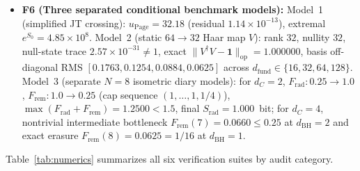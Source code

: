 \documentclass[11pt,a4paper]{article}
\theoremstyle{definition}
\theoremstyle{remark}
\newcommand{\cT}{\mathcal{T}}
\newcommand{\1}{\mathbf{1}}
\newcommand{\code}[1]{{\scriptsize\ttfamily #1}}
\begin{document}
\begin{itemize}
  Integrates \eqref{eq:regge-wheeler}--\eqref{eq:dirac-4d} across five channels ($h=0,\ell=0,1$; $h=\frac{1}{2},j=\frac{1}{2}$; $h=1,\ell=1$; $h=2,\ell=2$) via near-horizon-stabilized \code{wrightomega} inversion ($\delta=\mathrm{wrightomega}(x-1)$, $f=\delta/(1+\delta)$) and \code{DOP853} ($r_{\mathrm{tol}}=10^{-12}$): max relative Wronskian residual (normalized by $|A_{\mathrm{in}}|^2$) $9.11\times 10^{-12}$ (max absolute $1.63\times 10^{-5}$ overall due to finite-precision cancellation in $|A_{\mathrm{in}}|^2-|A_{\mathrm{out}}|^2$ at ultra-small $\cT$, $3.15\times 10^{-9}$ for $\cT>10^{-6}$); inner-boundary shifts ($x_{\min}=-45\to -80$) $\le 8.79\times 10^{-9}$; outer-matching shifts ($c_{\mathrm{out}}=120\to 240$) $\le 3.00\times 10^{-7}$ (Dirac $(-80,480)$ shift $9.34\times 10^{-9}$; naive $f=1-1/y$ rounding shift $-6.76\times 10^{-7}$); Dirac SUSY $2.13\times 10^{-7}$; ultra-low benchmarks (scalar $\sigma/A=1.01636$, Weyl $0.12708$, photon $\cT/\tilde{\omega}^4=0.45931$, graviton $\cT/\tilde{\omega}^6=0.019019$); fixed-$\omega r_s=0.4$ control $\cT_{0,0}=0.90894$; KMS linear shutdown to $0.0$; distant-mode vs.\ horizon-port control at $\omega=0.4$ and unit coupling $g=1$ confirms $D_{K,\mathrm{out}}(\cT=0)=\gamma_{\downarrow,\mathrm{out}}(\cT=0)=0.2 > 0$ vs.\ $D_{K,\mathrm{hor}}(\cT=0)=0.0$ (horizon-port KMS ratio error $1.13\times 10^{-17}$).
  \item \textbf{F6 (Three separated conditional benchmark models):}
  Model~1 (simplified JT crossing): $u_{\mathrm{Page}}=32.18$ (residual $1.14\times 10^{-13}$), extremal $e^{S_0}=4.85\times 10^8$. Model~2 (static $64\to 32$ Haar map $V$): rank $32$, nullity $32$, null-state trace $2.57\times 10^{-31}\neq 1$, exact $\|V^\dagger V-\1\|_{\mathrm{op}}=1.000000$, basis off-diagonal RMS $[0.1763, 0.1254, 0.0884, 0.0625]$ across $d_{\mathrm{fund}}\in\{16,32,64,128\}$. Model~3 (separate $N=8$ isometric diary models): for $d_C=2$, $F_{\mathrm{rad}}:0.25\to 1.0$, $F_{\mathrm{rem}}:1.0\to 0.25$ (cap sequence $(1,\dots,1,1/4)$), $\max(F_{\mathrm{rad}}+F_{\mathrm{rem}})=1.2500<1.5$, final $S_{\mathrm{rad}}=1.000$~bit; for $d_C=4$, nontrivial intermediate bottleneck $F_{\mathrm{rem}}(7)=0.0660\le 0.25$ at $d_{\mathrm{BH}}=2$ and exact erasure $F_{\mathrm{rem}}(8)=0.0625=1/16$ at $d_{\mathrm{BH}}=1$.
\end{itemize}

Table~\ref{tab:numerics} summarizes all six verification suites by audit category.
\end{document}

